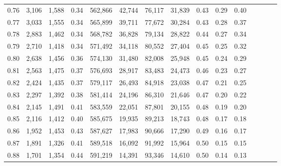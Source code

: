 \begin{tabular}{rrrcrrrrrrrrrrr}
0.76 &   3,106 &  1,588 &                                       0.34 &  562,866 &   42,744 &   76,117 &   31,839 &  0.43 &  0.29 &                         0.40 \\
0.77 &   3,033 &  1,555 &                                       0.34 &  565,899 &   39,711 &   77,672 &   30,284 &  0.43 &  0.28 &                         0.37 \\
0.78 &   2,883 &  1,462 &                                       0.34 &  568,782 &   36,828 &   79,134 &   28,822 &  0.44 &  0.27 &                         0.34 \\
0.79 &   2,710 &  1,418 &                                       0.34 &  571,492 &   34,118 &   80,552 &   27,404 &  0.45 &  0.25 &                         0.32 \\
0.80 &   2,638 &  1,456 &                                       0.36 &  574,130 &   31,480 &   82,008 &   25,948 &  0.45 &  0.24 &                         0.29 \\
0.81 &   2,563 &  1,475 &                                       0.37 &  576,693 &   28,917 &   83,483 &   24,473 &  0.46 &  0.23 &                         0.27 \\
0.82 &   2,424 &  1,435 &                                       0.37 &  579,117 &   26,493 &   84,918 &   23,038 &  0.47 &  0.21 &                         0.25 \\
0.83 &   2,297 &  1,392 &                                       0.38 &  581,414 &   24,196 &   86,310 &   21,646 &  0.47 &  0.20 &                         0.22 \\
0.84 &   2,145 &  1,491 &                                       0.41 &  583,559 &   22,051 &   87,801 &   20,155 &  0.48 &  0.19 &                         0.20 \\
0.85 &   2,116 &  1,412 &                                       0.40 &  585,675 &   19,935 &   89,213 &   18,743 &  0.48 &  0.17 &                         0.18 \\
0.86 &   1,952 &  1,453 &                                       0.43 &  587,627 &   17,983 &   90,666 &   17,290 &  0.49 &  0.16 &                         0.17 \\
0.87 &   1,891 &  1,326 &                                       0.41 &  589,518 &   16,092 &   91,992 &   15,964 &  0.50 &  0.15 &                         0.15 \\
0.88 &   1,701 &  1,354 &                                       0.44 &  591,219 &   14,391 &   93,346 &   14,610 &  0.50 &  0.14 &                         0.13 \\

\end{tabular}
